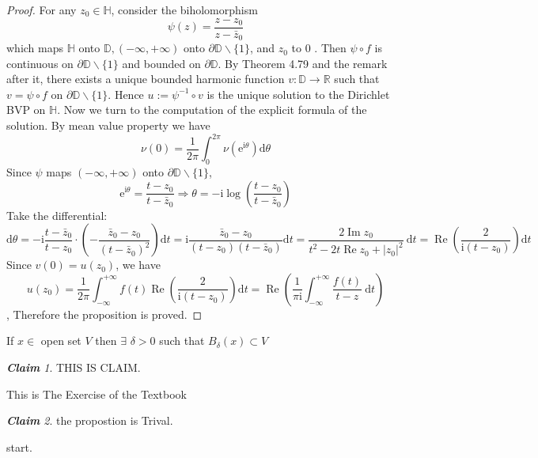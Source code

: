 \documentclass[11pt, a4paper, openany]{book}
\newenvironment{Proof of claim}
  {\renewcommand\qedsymbol{$\blacksquare$}\begin{proof}[Proof of claim]}
  {\end{proof}}
\newcommand{\Prot}[2]{\begin{Property}{#1}{}#2\end{Property}}
\newcommand{\ex}[2]{\begin{Exercise}{#1}{}#2\end{Exercise}}
\theoremstyle{remark}
\newcounter{theo}[subsection]
\newcounter{proposition}[section]
\theoremstyle{remark}
\theoremstyle{remark}
\newtheorem{claim}{\bfseries Claim}
\theoremstyle{remark}
\begin{document}
\begin{proof}
    For any $z_0 \in \mathbb{H}$, consider the biholomorphism
    $$
    \psi(z)=\frac{z-z_0}{z-\bar{z}_0}
    $$
    which maps $\mathbb{H}$ onto $\mathbb{D},(-\infty,+\infty)$ onto $\partial \mathbb{D} \backslash\{1\}$, and $z_0$ to 0 . Then $\psi \circ f$ is continuous on $\partial \mathbb{D} \backslash\{1\}$ and bounded on $\partial \mathbb{D}$. By Theorem 4.79 and the remark after it, there exists a unique bounded harmonic function $v: \mathbb{D} \rightarrow \mathbb{R}$ such that $v=\psi \circ f$ on $\partial \mathbb{D} \backslash\{1\}$. Hence $u:=\psi^{-1} \circ v$ is the unique solution to the Dirichlet BVP on $\mathbb{H}$.
    Now we turn to the computation of the explicit formula of the solution. By mean value property we have
    $$
    \nu(0)=\frac{1}{2 \pi} \int_0^{2 \pi} \nu\left(\mathrm{e}^{\mathrm{i} \theta}\right) \mathrm{d} \theta
    $$
    Since $\psi$ maps $(-\infty,+\infty)$ onto $\partial \mathbb{D} \backslash\{1\}$,
    $$
    \mathrm{e}^{\mathrm{i} \theta}=\frac{t-z_0}{t-\bar{z}_0} \Rightarrow \theta=-\mathrm{i} \log \left(\frac{t-z_0}{t-\bar{z}_0}\right)
    $$
    Take the differential:
    $$
    \mathrm{d} \theta=-\mathrm{i} \frac{t-\bar{z}_0}{t-z_0} \cdot\left(-\frac{\bar{z}_0-z_0}{\left(t-\bar{z}_0\right)^2}\right) \mathrm{d} t=\mathrm{i} \frac{\bar{z}_0-z_0}{\left(t-z_0\right)\left(t-\bar{z}_0\right)} \mathrm{d} t=\frac{2 \operatorname{Im} z_0}{t^2-2 t \operatorname{Re} z_0+\left|z_0\right|^2} \mathrm{~d} t=\operatorname{Re}\left(\frac{2}{\mathrm{i}\left(t-z_0\right)}\right) \mathrm{d} t
    $$
    Since $v(0)=u\left(z_0\right)$, we have
    $$
    u\left(z_0\right)=\frac{1}{2 \pi} \int_{-\infty}^{+\infty} f(t) \operatorname{Re}\left(\frac{2}{\mathrm{i}\left(t-z_0\right)}\right) \mathrm{d} t=\operatorname{Re}\left(\frac{1}{\pi \mathrm{i}} \int_{-\infty}^{+\infty} \frac{f(t)}{t-z} \mathrm{~d} t\right)
    $$, Therefore the proposition is proved.

\end{proof}

\Prot{}{If $x\in$ open set $V$ then $\exists$ $\delta>0$ such that $B_{\delta}(x)\subset V$}
\begin{claim}
    THIS IS CLAIM.
\end{claim}
\ex{}{This is The Exercise of the Textbook}
\begin{claim}
the propostion is Trival.
\end{claim}
\begin{Proof of claim}
    start.
\end{Proof of claim}
\end{document}
